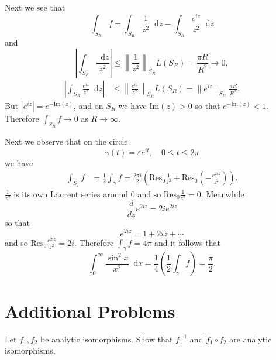 \documentclass{article}
\newcommand\Res{\mathrm{Res}}
\renewcommand\Im{\mathrm{Im}}
\newcommand\dif{\mathop{}\!\mathrm{d}}
\newcounter{Problem}
\newenvironment{Problem}{\begin{Exercise}[name={Problem},
                                          counter={Problem}]}
                        {\end{Exercise}}
\begin{document}
Next we see that
$$
   \int_{S_R} f
=  \int_{S_R}
     \frac{1}{z^2}
     \dif z
-  \int_{S_R}
     \frac{e^{iz}}{z^2}
     \dif z
$$
and
$$
     \left|
       \int_{S_R}
         \frac{\dif z}{z^2}
     \right|
\leq \left\|
       \frac{1}{z^2}
     \right\|_{S_R}
     L(S_R)
=    \frac{\pi R}{R^2}
\to  0,
$$
\begin{align*}
      \left|
        \int_{S_R}
          \frac{e^{iz}}{z^2}
          \dif z
      \right|
&\leq \left\|
        \frac{e^{iz}}{z^2}
      \right\|_{S_R}
      L(S_R)
 =    \|e^{iz}\|_{S_R} \frac{\pi R}{R^2}.
\end{align*}
But $|e^{iz}| = e^{-\Im(z)}$, and on $S_R$ we have
$\Im(z) > 0$ so that $e^{-\Im(z)} < 1$. Therefore
$\int_{S_R} f \to 0$ as $R \to \infty$.

Next we observe that on the circle
$$
\gamma(t) = \varepsilon e^{i t}, \quad
0 \leq t \leq 2 \pi
$$
we have
\begin{align*}
   \int_{S_\varepsilon} f
&= \frac{1}{2}
   \int_\gamma f
 = \frac{2 \pi i}{2}
   \left(
     \Res_0 \frac{1}{z^2}
   + \Res_0 \left(
       -\frac{e^{2 i z}}{z^2}
     \right)
   \right).
\end{align*}
$\frac{1}{z^2}$ is its own Laurent series around 0 and so
$\Res_0 \frac{1}{z^2} = 0$. Meanwhile
$$
\frac{d}{dz} e^{2 i z} = 2 i e^{2 i z}
$$
so that
$$
e^{2 i z} = 1 + 2 i z + \cdots
$$
and so $\Res_0 \frac{e^{2 i z}}{z^2} = 2 i$.
Therefore $\int_\gamma f = 4 \pi$ and it follows that
$$
  \int_0^\infty
    \frac{\sin^2 x}{x^2}
    \dif x
= \frac{1}{4}
  \left(
    \frac{1}{2}
    \int_\gamma f
  \right)
= \frac{\pi}{2}.
$$

\section{Additional Problems}
\begin{Problem}
Let $f_1, f_2$ be analytic isomorphisms. Show that
$f_1^{-1}$ and $f_1 \circ f_2$ are analytic isomorphisms.
\end{Problem}
\end{document}
